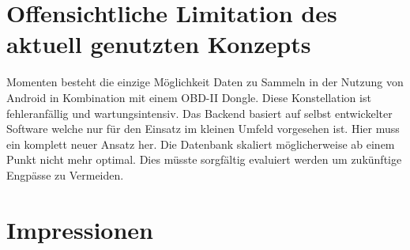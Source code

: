 \documentclass[12pt,a4paper,bibliography=totocnumbered,listof=totocnumbered]{scrartcl}
\begin{document}
\section{Offensichtliche Limitation des aktuell genutzten Konzepts}

Momenten besteht die einzige Möglichkeit Daten zu Sammeln in der Nutzung von Android in Kombination mit einem OBD-II Dongle. Diese Konstellation ist fehleranfällig und wartungsintensiv.
Das Backend basiert auf selbst entwickelter Software welche nur für den Einsatz im kleinen Umfeld vorgesehen ist. Hier muss ein komplett neuer Ansatz her.
Die Datenbank skaliert möglicherweise ab einem Punkt nicht mehr optimal. Dies müsste sorgfältig evaluiert werden um zukünftige Engpässe zu Vermeiden.

\section{Impressionen}
\end{document}
